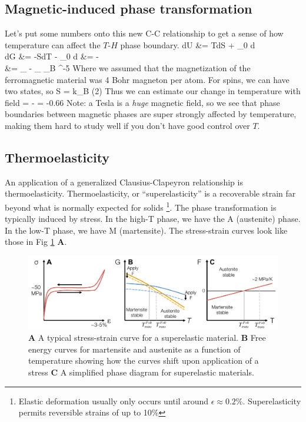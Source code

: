 \documentclass[12pt]{article}
\begin{document}
\subsection{Magnetic-induced phase transformation}
Let's put some numbers onto this new C-C relationship to get a sense of how temperature can affect the $T$-$H$ phase boundary.
\eqs
dU &= TdS + \mu_0  d\\
dG &= -SdT - \mu_0  d
\eqe
\eqs
{} &= -\\
\eqe
\eqs
\Delta {} &= _ - _  \mu_B  ^{-5} 
\eqe
Where we assumed that the magnetization of the ferromagnetic material was 4 Bohr magneton per atom.  For spins, we can have two states, so 
\eqs
\Delta S = k_B \ln(2)
\eqe
Thus we can estimate our change in temperature with field
\eqs
{} = - = -0.66 
\eqe
Note: a Tesla is a \emph{huge} magnetic field, so we see that phase boundaries between magnetic phases are super strongly affected by temperature, making them hard to study well if you don't have good control over $T$.

\subsection{Thermoelasticity}
An application of a generalized Clausius-Clapeyron relationship is thermoelasticity. Thermoelasticity, or ``superelasticity'' is a recoverable strain far beyond what is normally expected for solids \footnote{Elastic deformation usually only occurs until around $\epsilon \approx 0.2\%$. Superelasticity permits reversible strains of up to 10\%}.  The phase transformation is typically induced by stress.  In the high-T phase, we have the A (austenite) phase.  In the low-T phase, we have M (martensite).
The stress-strain curves look like those in Fig \ref{superElasticity} \textbf{A}.

\begin{figure}[h]
\centering
\includegraphics[width=\textwidth]{superelasticity}
\caption{\textbf{A} A typical stress-strain curve for a superelastic material. \textbf{B} Free energy curves for martensite and austenite as a function of temperature showing how the curves shift upon application of a stress \textbf{C} A simplified phase diagram for superelastic materials.}
\label{superElasticity}
\end{figure}
\end{document}
